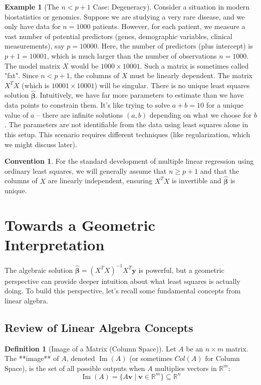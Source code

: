 \documentclass[11pt]{article}
\theoremstyle{definition}
\newtheorem{definition}[theorem]{Definition}
\newtheorem{example}[theorem]{Example}
\newtheorem{convention}[theorem]{Convention}
\newcommand{\R}{\mathbb{R}}
\newcommand{\T}{^T} %
\DeclareMathOperator{\Image}{Im}
\begin{document}
\begin{example}[The $n < p+1$ Case: Degeneracy]
Consider a situation in modern biostatistics or genomics. Suppose we are studying a very rare disease, and we only have data for $n=1000$ patients. However, for each patient, we measure a vast number of potential predictors (genes, demographic variables, clinical measurements), say $p=10000$.
Here, the number of predictors (plus intercept) is $p+1 = 10001$, which is much larger than the number of observations $n=1000$.
The model matrix $X$ would be $1000 \times 10001$. Such a matrix is sometimes called "fat".
Since $n < p+1$, the columns of $X$ must be linearly dependent. The matrix $X\T X$ (which is $10001 \times 10001$) will be singular. There is no unique least squares solution $\hat{\boldsymbol{\beta}}$. Intuitively, we have far more parameters to estimate than we have data points to constrain them. It's like trying to solve $a+b=10$ for a unique value of $a$ – there are infinite solutions $(a,b)$ depending on what we choose for $b$. The parameters are not identifiable from the data using least squares alone in this setup. This scenario requires different techniques (like regularization, which we might discuss later).
\end{example}

\begin{convention}
For the standard development of multiple linear regression using ordinary least squares, we will generally assume that $n \ge p+1$ and that the columns of $X$ are linearly independent, ensuring $X\T X$ is invertible and $\hat{\boldsymbol{\beta}}$ is unique.
\end{convention}

\section{Towards a Geometric Interpretation}

The algebraic solution $\hat{\boldsymbol{\beta}} = (X\T X)^{-1} X\T \mathbf{y}$ is powerful, but a geometric perspective can provide deeper intuition about what least squares is actually doing. To build this perspective, let's recall some fundamental concepts from linear algebra.

\subsection{Review of Linear Algebra Concepts}

\begin{definition}[Image of a Matrix (Column Space)]
Let $A$ be an $n \times m$ matrix. The **image** of $A$, denoted $\Image(A)$ (or sometimes $Col(A)$ for Column Space), is the set of all possible outputs when $A$ multiplies vectors in $\R^m$:
\[ \Image(A) = \{ A\mathbf{v} \mid \mathbf{v} \in \R^m \} \subseteq \R^n \]
\end{definition}
\end{document}
